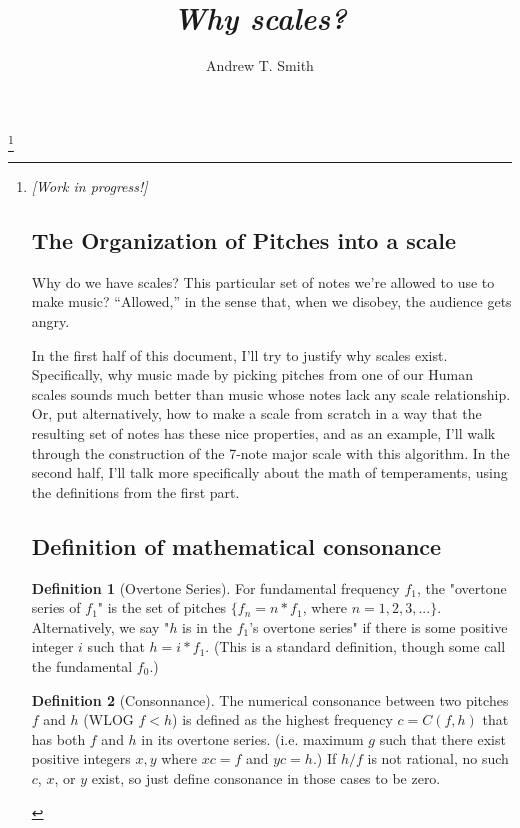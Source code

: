 \documentclass[letterpaper]{article}
\title{\emph{Why scales?}}
\author{Andrew T. Smith}
\theoremstyle{definition}
\newtheorem{definition}{Definition}[section]
\begin{document}
\maketitle
\thanks{\emph{[Work in progress!]}



\section{The Organization of Pitches into a scale}

Why do we have scales?  This particular set of notes we're allowed to use to make music?  ``Allowed,'' in the sense that, when we disobey, the audience gets angry.

 In the first half of this document, I'll try to justify why scales exist.  Specifically, why music made by picking pitches from one of our Human scales sounds much better than music whose notes lack any scale relationship.  Or, put alternatively, how to make a scale from scratch in a way that the resulting set of notes has these nice properties, and as an example, I'll walk through the construction of the 7-note major scale with this algorithm.  In the second half, I'll talk more specifically about the math of temperaments, using the definitions from the first part.

\subsection{Definition of mathematical consonance}
\theoremstyle{definition}
\begin{definition}[Overtone Series]
\label{overtones}
For fundamental frequency $f_1$, the "overtone series of $f_1$" is the set of pitches $\{f_n = n * f_1$, where $n=1, 2, 3, ...\}$.  Alternatively, we say "$h$ is in the $f_1$'s overtone series" if there is some positive integer $i$ such that $h = i * f_1$. (This is a standard definition, though some call the fundamental $f_0$.)

\end{definition}



\theoremstyle{definition}
\begin{definition}[Consonnance]
\label{consonnance}
The numerical consonance between two pitches $f$ and $h$ (WLOG $f < h$) is defined as the highest frequency $c = C(f, h)$ that has both $f$ and $h$ in its overtone series.  (i.e. maximum $g$ such that there exist positive integers $x, y$ where $xc=f$ and $yc=h$.)  If $h/f$ is not rational, no such $c$, $x$, or $y$ exist, so just define consonance in those cases to be zero. 



\end{definition}}
\end{document}
